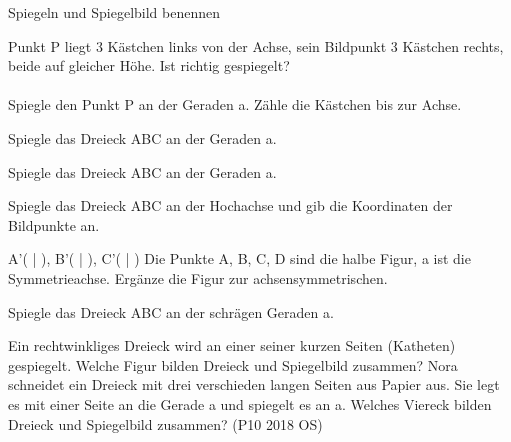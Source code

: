 \begin{aufgabe}{Spiegeln und Spiegelbild benennen}
\begin{teile}
\teil Punkt P liegt 3 Kästchen links von der Achse, sein Bildpunkt 3 Kästchen rechts, beide auf gleicher Höhe. Ist richtig gespiegelt? \\  \\ 
\teil Spiegle den Punkt P an der Geraden a. Zähle die Kästchen bis zur Achse.

\begin{ksys}[xmin=0,xmax=9,ymin=0,ymax=8]   \end{ksys}
\teil Spiegle das Dreieck ABC an der Geraden a.

\begin{ksys}[xmin=0,xmax=10,ymin=0,ymax=7]     \end{ksys}
\teil Spiegle das Dreieck ABC an der Geraden a.

\begin{ksys}[xmin=0,xmax=8,ymin=-2,ymax=9]     \end{ksys}
\teil Spiegle das Dreieck ABC an der Hochachse und gib die Koordinaten der Bildpunkte an.

\begin{ksys}[xmin=-6,xmax=6,ymin=-6,ymax=6]    \end{ksys}
A'( \leerfeld | \leerfeld ), B'( \leerfeld | \leerfeld ), C'( \leerfeld | \leerfeld )
\teil Die Punkte A, B, C, D sind die halbe Figur, a ist die Symmetrieachse. Ergänze die Figur zur achsensymmetrischen.

\begin{ksys}[xmin=0,xmax=8,ymin=0,ymax=7]      \end{ksys}
\teil Spiegle das Dreieck ABC an der schrägen Geraden a.

\begin{ksys}[xmin=0,xmax=8,ymin=0,ymax=8]     \end{ksys}
\teil Ein rechtwinkliges Dreieck wird an einer seiner kurzen Seiten (Katheten) gespiegelt. Welche Figur bilden Dreieck und Spiegelbild zusammen?
\teil Nora schneidet ein Dreieck mit drei verschieden langen Seiten aus Papier aus. Sie legt es mit einer Seite an die Gerade a und spiegelt es an a. Welches Viereck bilden Dreieck und Spiegelbild zusammen? \hfill (P10 2018 OS)
\end{teile}
\end{aufgabe}

